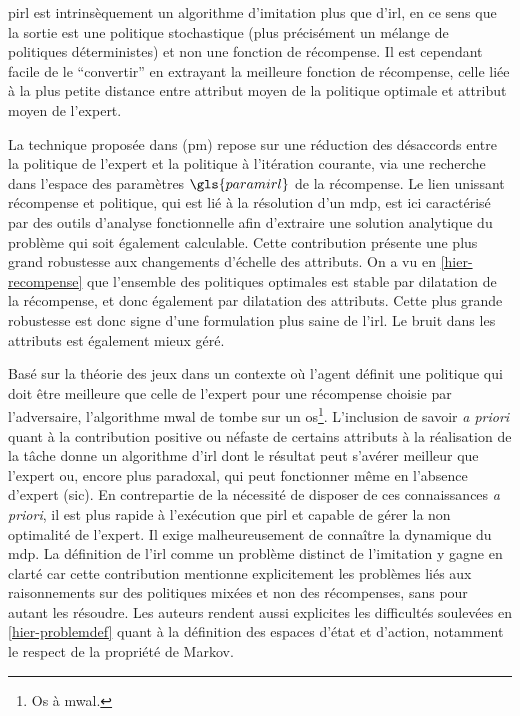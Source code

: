 \documentclass[frenchb,a4paper,justified,notoc]{tufte-book}
\newcommand{\paramirl}{\gls{paramirl}}
\begin{document}
\gls{pirl} est intrinsèquement un algorithme d'imitation plus que d'\gls{irl}, en ce sens que la sortie est une politique stochastique (plus précisément un mélange de politiques déterministes) et non une fonction de récompense. Il est cependant facile de le ``convertir'' en extrayant la meilleure fonction de récompense, celle liée à la plus petite distance entre attribut moyen de la politique optimale et attribut moyen de l'expert. 

   La technique proposée dans \citep{neu2007apprenticeship} (\gls{pm}) repose sur une réduction des désaccords entre la politique de l'expert et la politique à l'itération courante, via une recherche dans l'espace des paramètres $\paramirl$ de la récompense. Le lien unissant récompense et politique, qui est lié à la résolution d'un \gls{mdp}, est ici caractérisé par des outils d'analyse fonctionnelle afin d'extraire une solution analytique du problème qui soit également calculable. Cette contribution présente une plus grand robustesse aux changements d'échelle des attributs. On a vu en \autoref{hier-recompense} que l'ensemble des politiques optimales est stable par dilatation de la récompense, et donc également par dilatation des attributs. Cette plus grande robustesse est donc signe d'une formulation plus saine de l'\gls{irl}. Le bruit dans les attributs est également mieux géré.

   Basé sur la théorie des jeux dans un contexte où l'agent définit une politique qui doit être meilleure que celle de l'expert pour une récompense choisie par l'adversaire, l'algorithme \gls{mwal} de \citet{syed2008game} tombe sur un os\footnote{Os à \gls{mwal}.
 }. L'inclusion de savoir \emph{a priori} quant à la contribution positive ou néfaste de certains attributs à la réalisation de la tâche donne un algorithme d'\gls{irl} dont le résultat peut s'avérer meilleur que l'expert ou, encore plus paradoxal, qui peut fonctionner même en l'absence d'expert (sic). En contrepartie de la nécessité de disposer de ces connaissances \emph{a priori}, il est plus rapide à l'exécution que \gls{pirl} et capable de gérer la non optimalité de l'expert. Il exige malheureusement de connaître la dynamique du \gls{mdp}. La définition de l'\gls{irl} comme un problème distinct de l'imitation y gagne en clarté car cette contribution mentionne explicitement les problèmes liés aux raisonnements sur des politiques mixées et non des récompenses, sans pour autant les résoudre. Les auteurs rendent aussi explicites les difficultés soulevées en \autoref{hier-problemdef} quant à la définition des espaces d'état et d'action, notamment le respect de la propriété de Markov.
\end{document}
